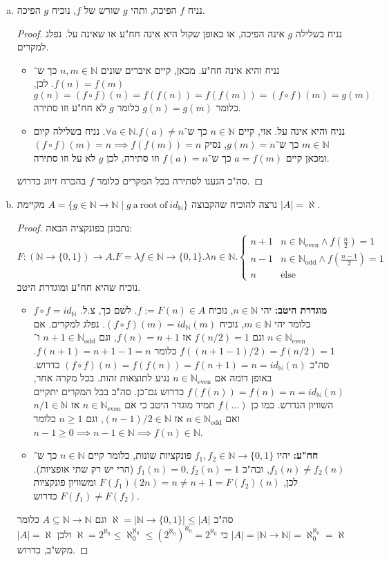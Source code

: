 \documentclass[]{article}
\newcommand\N     {\mathbb{N}}
\newcommand\Neven {\N_{\mathrm{even}}}
\newcommand\Nodd  {\N_{\mathrm{odd }}}
\newcommand\other {\text{else}}
\newcommand\az    {\aleph_0}
\newcommand\uaz   {^{\aleph_0}}
\newcommand\al    {\aleph}
\newcommand\taz   {2^{\aleph_0}}
\begin{document}
	\begin{enumerate}[(a)]
		\item נניח $f$ הפיכה, ותהי $g$ שורש של $f$, נוכיח $g$ הפיכה. \begin{proof}
			נניח בשלילה $g$ אינה הפיכה, או באופן שקול היא אינה חח"ע או שאינה על. נפלג למקרים. 
			\begin{itemize}
				\item נניח והיא אינה חח"ע. מכאן, קיים איברים שונים $n, m \in \N$ כך ש־$f(n) = f(m)$. לכן, $g(n) = (f \circ f)(n) = f(f(n)) = f(f(m)) = (f \circ f)(m) = g(m)$ כלומר $g(n) = g(m)$ כלומר $g$ לא חח"ע וזו סתירה. 
				\item נניח והיא אינה על. אזי, קיים $n \in \N$ כך ש־$\forall a \in \N. f(a) \neq n$. נניח בשלילה קיום $m \in \N$ כך ש־$g(m) = n$, נסיק $(f \circ f)(m) = n \implies f(f(m)) = n$ ומכאן קיים $a = f(m)$ כך ש־$f(a) = n$ וזו סתירה, לכן $g$ לא על וזו סתירה. 
			\end{itemize}
			סה"כ הגענו לסתירה בכל המקרים כלומר $f$ בהכרח זיווג כדרוש. 
		\end{proof}
		\item נרצה להוכיח שהקבוצה $A = \{g \in \N \to \N \mid g \ \mathrm{a \ root \ of } \ id_\N \}$ מקיימת $|A| = \al$. \begin{proof}
			נתבונן בפונקציה הבאה: 
			\[ F \colon (\N \to \{0, 1\}) \to A. F = \lambda f \in \N \to \{0, 1\}. \lambda n \in \N. \begin{cases}
				n + 1  &  n \in \Neven \land f\left (\frac{n}{2} \right ) = 1 \\
				n - 1  &  n \in \Nodd \land f\left (\frac{n - 1}{2} \right ) = 1 \\
				n & \other
			\end{cases} \]
			נוכיח שהיא חח"ע ומוגדרת היטב. 
			\begin{itemize}
				\item \textbf{מוגדרת היטב: }יהי $n \in \N$, נוכיח $f := F(n) \in A$. לשם כך, צ.ל. $f \circ f = id_\N$ כלומר יהי $m \in \N$, נוכיח $(f \circ f)(m) = id_\N(m)$. נפלג למקרים. אם $n \in \Neven$ וגם $f(n/2) = 1$ אז $f(n) = n + 1$, וגם $n + 1 \in \Nodd$ ו־$f((n + 1 - 1)/2) = f(n/2) = 1$  כלומר $f(n + 1) = n + 1 - 1 = n $. סה"כ $(f \circ f)(n) = f(f(n)) = f(n + 1) = n = id_\N(n) $ כדרוש. באופן דומה אם $n \in \Neven $ נגיע לתוצאות זהות. בכל מקרה אחר, $f(f(n)) = f(n) = n = id_\N(n)$ כדרוש גם־כן. סה"כ בכל המקרים יתקיים השוויון הנדרש. כמו כן $f(\dots)$ תמיד מוגדר היטב כי אם $n \in \Neven$ אז $n/ 1 \in \N$ ואם $n \in \Nodd$ אז $(n - 1)/2 \in \N$, וגם $n \ge 1$ כלומר $n - 1 \ge 0 \implies n - 1 \in \N \implies f(n) \in \N$. 
				\item \textbf{חח"ע: }יהיו $f_1, f_2 \in \N \to \{0, 1\}$ פונקציות שונות, כלומר קיים $n \in \N$ כך ש־$f_1(n) \neq f_2(n)$, ובה"כ $f_1(n) = 0, f_2(n) = 1$ (הרי יש רק שתי אופציות). לכן, $F(f_1)(2n) = n \neq n + 1 = F(f_2)(n)$ ומשוויון פונקציות $F(f_1) \neq F(f_2)$ כדרוש. 
			\end{itemize}
			סה"כ $\al = |\N \to \{0, 1\}| \le |A|$ וגם $A \subseteq \N \to \N$ כלומר $|A| = |\N \to \N| = \az\uaz = \al$ כי $\al = \taz \le \az\uaz \le (\taz)\uaz = \taz$ ולכן $|A| = \al$ מקש"ב, כדרוש. 
		\end{proof}
	\end{enumerate}
	
\end{document}
